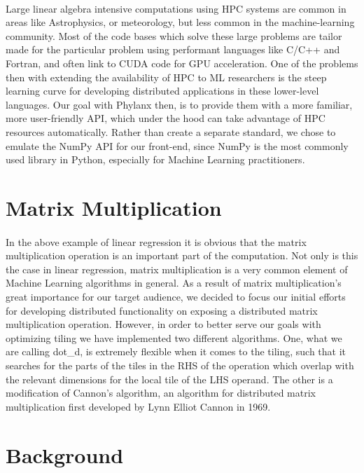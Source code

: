 \paragraph{}
Large linear algebra intensive computations using HPC systems are common in areas like Astrophysics, or meteorology, but less common in the machine-learning community. Most of the code bases which solve these large problems are tailor made for the particular problem using performant languages like C/C++ and Fortran, and often link to CUDA code for GPU acceleration. One of the problems then with extending the availability of HPC to ML researchers is the steep learning curve for developing distributed applications in these lower-level languages. Our goal with Phylanx then, is to provide them with a more familiar, more user-friendly API, which under the hood can take advantage of HPC resources automatically. Rather than create a separate standard, we chose to emulate the NumPy API for our front-end, since NumPy is the most commonly used library in Python, especially for Machine Learning practitioners.
\section{Matrix Multiplication}
\paragraph{}
In the above example of linear regression it is obvious that the matrix multiplication operation is an important part of the computation. Not only is this the case in linear regression, matrix multiplication is a very common element of Machine Learning algorithms in general. As a result of matrix multiplication's great importance for our target audience, we decided to focus our initial efforts for developing distributed functionality on exposing a distributed matrix multiplication operation. However, in order to better serve our goals with optimizing tiling we have implemented two different algorithms. One, what we are calling dot\_d, is extremely flexible when it comes to the tiling, such that it searches for the parts of the tiles in the RHS of the operation which overlap with the relevant dimensions for the local tile of the LHS operand. The other is a modification of Cannon's algorithm, an algorithm for distributed matrix multiplication first developed by Lynn Elliot Cannon in 1969.

\section{Background}
